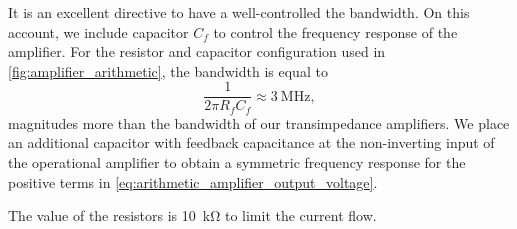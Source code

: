 It is an excellent directive to have a well-controlled the bandwidth.
On this account, we include capacitor $C_f$ to control the frequency response of the amplifier. 
For the resistor and capacitor configuration used in \cref{fig:amplifier_arithmetic}, the bandwidth is equal to
\begin{equation}
	\frac{1}{2\pi R_fC_f}\approx\SI{3}{\mega\hertz},
\end{equation}
magnitudes more than the bandwidth of our transimpedance amplifiers.
We place an additional capacitor with feedback capacitance at the non-inverting input of the operational amplifier to obtain a symmetric frequency response for the positive terms in \cref{eq:arithmetic_amplifier_output_voltage}.

The value of the resistors is \SI{10}{\kilo\ohm} to limit the current flow.

